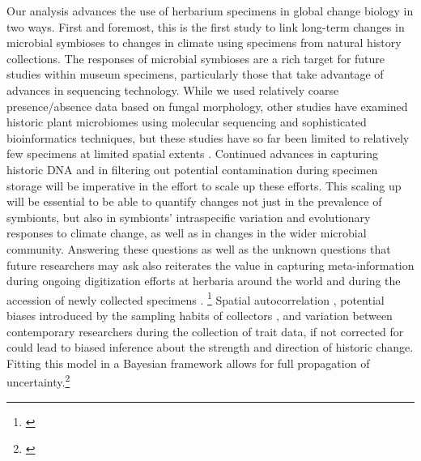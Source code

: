 \documentclass[11pt]{article}
\newcommand{\tom}[2]{{\color{red}{#1}}\footnote{\textit{\color{red}{#2}}}}
\begin{document}
Our analysis advances the use of herbarium specimens in global change biology in two ways. 
First and foremost, this is the first study to link long-term changes in microbial symbioses to changes in climate using specimens from natural history collections.
The responses of microbial symbioses are a rich target for future studies within museum specimens, particularly those that take advantage of advances in sequencing technology.
While we used relatively coarse presence/absence data based on fungal morphology, other studies have examined historic plant microbiomes using molecular sequencing and sophisticated bioinformatics techniques, but these studies have so far been limited to relatively few specimens at limited spatial extents \cite{yoshida2015computational, heberling2019utilizing, bieker2020metagenomic, gross2021hidden, bradshaw2021global}. 
Continued advances in capturing historic DNA and in filtering out potential contamination during specimen storage \citep{daru2019novel, bakker2020herbarium, raxworthy2021mining} will be imperative in the effort to scale up these efforts. 
This scaling up will be essential to be able to quantify changes not just in the prevalence of symbionts, but also in symbionts' intraspecific variation and evolutionary responses to climate change, as well as  in changes in the wider microbial community. 
Answering these questions as well as the unknown questions that future researchers may ask also reiterates the value in capturing meta-information during ongoing digitization efforts at herbaria around the world and during the accession of newly collected specimens \citep{lendemer2020extended}.
\tom{Second, we accounted for several potential biases in the data observation process that may be common to many collections-based research questions by using a spatially-explicit random effects model. }{I think you should say more about collector and observer effects in the results.}
Spatial autocorrelation \cite{willems2022forest}, potential biases introduced by the sampling habits of collectors \citep{daru2018widespread}, and variation between contemporary researchers during the collection of trait data, if not corrected for could lead to biased inference about the strength and direction of historic change.
Fitting this model in a Bayesian framework allows for full propagation of uncertainty.\tom{}{Excellent paragraph.}
\end{document}
